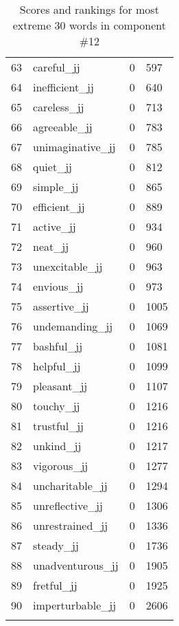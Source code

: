 \begin{longtable}[!htbp]{| rlr@{.}l |}
    63 & careful\_jj & 0 & 597 \\
    64 & inefficient\_jj & 0 & 640 \\
    65 & careless\_jj & 0 & 713 \\
    66 & agreeable\_jj & 0 & 783 \\
    67 & unimaginative\_jj & 0 & 785 \\
    68 & quiet\_jj & 0 & 812 \\
    69 & simple\_jj & 0 & 865 \\
    70 & efficient\_jj & 0 & 889 \\
    71 & active\_jj & 0 & 934 \\
    72 & neat\_jj & 0 & 960 \\
    73 & unexcitable\_jj & 0 & 963 \\
    74 & envious\_jj & 0 & 973 \\
    75 & assertive\_jj & 0 & 1005 \\
    76 & undemanding\_jj & 0 & 1069 \\
    77 & bashful\_jj & 0 & 1081 \\
    78 & helpful\_jj & 0 & 1099 \\
    79 & pleasant\_jj & 0 & 1107 \\
    80 & touchy\_jj & 0 & 1216 \\
    81 & trustful\_jj & 0 & 1216 \\
    82 & unkind\_jj & 0 & 1217 \\
    83 & vigorous\_jj & 0 & 1277 \\
    84 & uncharitable\_jj & 0 & 1294 \\
    85 & unreflective\_jj & 0 & 1306 \\
    86 & unrestrained\_jj & 0 & 1336 \\
    87 & steady\_jj & 0 & 1736 \\
    88 & unadventurous\_jj & 0 & 1905 \\
    89 & fretful\_jj & 0 & 1925 \\
    90 & imperturbable\_jj & 0 & 2606 \\
    \hline
    \caption{Scores and rankings for most extreme 30 words in component \#12} \\
\end{longtable}
